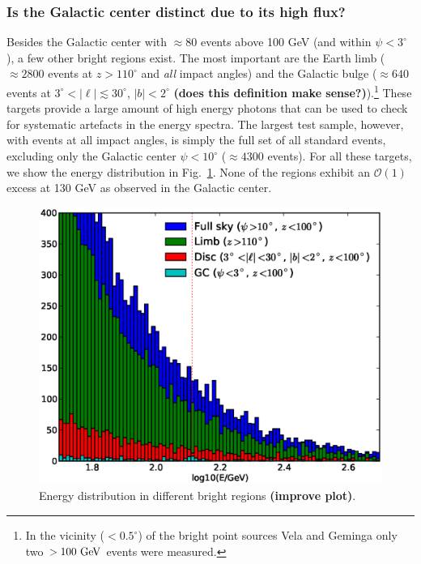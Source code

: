 \documentclass[aps,twocolumn,prd,superscriptaddress,showpacs,nofootinbib,fixfloat]{revtex4}
\newcommand{\GeV}{{\rm ~GeV}}
\begin{document}
\subsubsection{Is the Galactic center distinct due to its high flux?} Besides
the Galactic center with $\approx80$ events above 100 GeV (and within
$\psi<3^\circ$), a few other bright regions exist.  The most important are the
Earth limb ($\approx2800$ events at $z>110^\circ$ and \emph{all} impact
angles) and the Galactic bulge ($\approx640$ events at
$3^\circ<|\ell|\lesssim30^\circ$, $|b|<2^\circ$ \textbf{(does this definition
make sense?)}).\footnote{In the vicinity ($<0.5^\circ$) of the bright point
sources Vela and Geminga only two $>100\GeV$ events were measured.} These
targets provide a large amount of high energy photons that can be used to
check for systematic artefacts in the energy spectra. The largest test sample,
however, with events at all impact angles, is simply the full set of all
standard events, excluding only the Galactic center $\psi<10^\circ$ ($\approx
4300$ events). For all these targets, we show the energy distribution in
Fig.~\ref{fig:target_spectra}.  None of the regions exhibit an
$\mathcal{O}(1)$ excess at 130 GeV as observed in the Galactic center.

\begin{figure}
\centering
\includegraphics[width=1.0\linewidth]{plots/target_spectra.eps}
\caption{Energy distribution in different bright regions \textbf{(improve
plot)}.}
\label{fig:target_spectra}
\end{figure}
\end{document}
